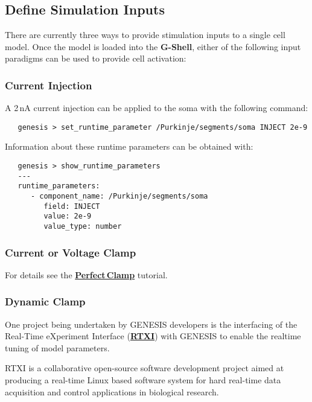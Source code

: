 \documentclass[12pt]{article}
\begin{document}
\subsection*{Define Simulation Inputs}

There are currently three ways to provide stimulation inputs to a single cell model. Once the model is loaded into the {\bf G-Shell}, either of the following input paradigms can be used to provide cell activation:

\subsubsection*{Current Injection}

A 2\,nA current injection can be applied to the soma with the following command:
\begin{verbatim}
   genesis > set_runtime_parameter /Purkinje/segments/soma INJECT 2e-9
\end{verbatim}

Information about these runtime parameters can be obtained with:
\begin{verbatim}
   genesis > show_runtime_parameters
   ---
   runtime_parameters:
      - component_name: /Purkinje/segments/soma
         field: INJECT
         value: 2e-9
         value_type: number
\end{verbatim}

\subsubsection*{Current or Voltage Clamp}

For details see the \href{../pclamp/pclamp.tex}{\bf Perfect\,Clamp} tutorial.

\subsubsection*{Dynamic Clamp}

One project being undertaken by GENESIS developers is the interfacing of the Real-Time eXperiment Interface (\href{http://www.rtxi.org/}{\bf RTXI}) with GENESIS to enable the realtime tuning of model parameters.

RTXI is a collaborative open-source software development project aimed at producing a real-time Linux based software system for hard real-time data acquisition and control applications in biological research. \\
\end{document}
